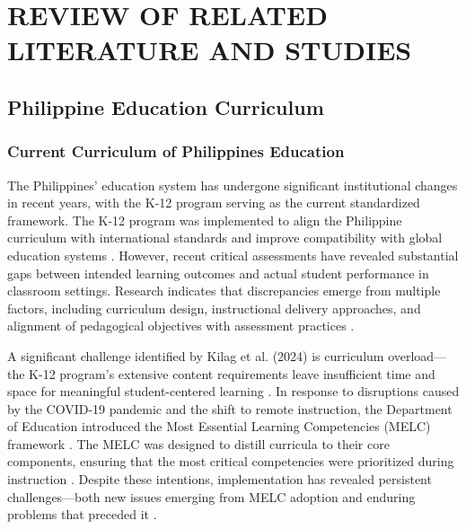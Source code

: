 \chapter{REVIEW OF RELATED LITERATURE AND STUDIES}

\section{Philippine Education Curriculum}

\subsection{Current Curriculum of Philippines Education}

The Philippines' education system has undergone significant institutional changes in recent years, with the K-12 program serving as the current standardized framework. The K-12 program was implemented to align the Philippine curriculum with international standards and improve compatibility with global education systems \cite{Abragan2022}. However, recent critical assessments have revealed substantial gaps between intended learning outcomes and actual student performance in classroom settings. Research indicates that discrepancies emerge from multiple factors, including curriculum design, instructional delivery approaches, and alignment of pedagogical objectives with assessment practices \cite{Descartin2023}.

A significant challenge identified by Kilag et al. (2024) is curriculum overload---the K-12 program's extensive content requirements leave insufficient time and space for meaningful student-centered learning \cite{Kilag2024}. In response to disruptions caused by the COVID-19 pandemic and the shift to remote instruction, the Department of Education introduced the Most Essential Learning Competencies (MELC) framework \cite{Marasigan2021}. The MELC was designed to distill curricula to their core components, ensuring that the most critical competencies were prioritized during instruction \cite{Zalun2023, Gallego2024}. Despite these intentions, implementation has revealed persistent challenges---both new issues emerging from MELC adoption and enduring problems that preceded it \cite{Angay2023, Gallego2024}.

